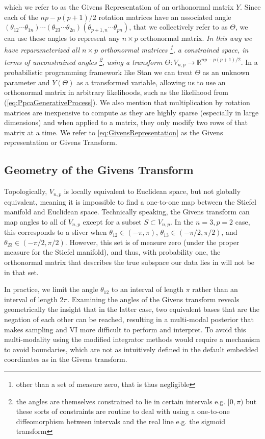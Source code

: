 \documentclass{article}
\begin{document}
which we refer to as the Givens Representation of an orthonormal matrix $Y$. Since each of the $np -p(p+1)/2$ rotation matrices have an associated  angle $(\theta_{12} \cdots \theta_{1n}) \cdots (\theta_{23} \cdots \theta_{2n}) (\theta_{p+1,n} \cdots \theta_{pn})$, that we collectively refer to as $\Theta$, we can use these angles to represent any $n \times p$ orthonormal matrix. \textit{In this way we have reparameterized all $n \times p$ orthonormal matrices \footnote{other than a set of measure zero, that is thus negligible}, a constrained space, in terms of unconstrained angles \footnote{the angles are themselves constrained to lie in certain intervals e.g. $[0, \pi)$ but these sorts of constraints are routine to deal with using a one-to-one diffeomorphism between intervals and the real line e.g. the sigmoid transform}, using a transform $\Theta: V_{n,p} \to \mathbb{R}^{np -p(p+1)/2}$}. In a probabilistic programming framework like Stan we can treat $\Theta$ as an unknown parameter and $Y(\Theta)$ as a transformed variable, allowing us to use an orthonormal matrix in arbitrary likelihoods, such as the likelihood from (\ref{eq:PpcaGenerativeProcess}). We also mention that multiplication by rotation matrices are inexpensive to compute as they are highly sparse (especially in large dimensions) and when applied to a matrix, they only modify two rows of that matrix at a time. We refer to \ref{eq:GivensRepresentation} as the Givens representation or Givens Transform.

\subsection{Geometry of the Givens Transform}\label{geomGivens}

Topologically, $V_{n,p}$ is locally equivalent to Euclidean space, but not globally equivalent, meaning it is impossible to find a one-to-one map between the Stiefel manifold and Euclidean space. Technically speaking, the Givens transform can map angles to all of $V_{n,p}$ except for a subset $S \subset V_{n,p}$.  In the $n=3, p=2$ case, this corresponds to a sliver when $\theta_{12} \in (-\pi, \pi)$, $\theta_{13} \in (-\pi/2, \pi/2)$, and $\theta_{23} \in (-\pi/2, \pi/2)$. However, this set is of measure zero (under the proper measure for the Stiefel manifold), and thus, with probability one, the orthonormal matrix that describes the true subspace our data lies in will not be in that set. 

In practice, we limit the angle $\theta_{12}$ to an interval of length $\pi$ rather than an interval of length $2\pi$.  Examining the angles of the Givens transform reveals geometrically the insight that in the latter case, two equivalent bases that are the negation of each other can be reached, resulting in a multi-modal posterior that makes sampling and VI more difficult to perform and interpret. To avoid this multi-modality using the modified integrator methods would require a mechanism to avoid boundaries, which are not as intuitively defined in the default embedded coordinates as in the Givens transform.
\end{document}
